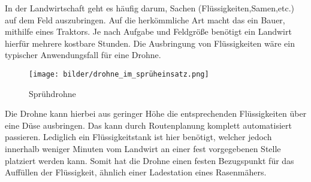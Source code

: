 In der Landwirtschaft geht es häufig darum, Sachen (Flüssigkeiten,Samen,etc.) auf dem Feld auszubringen. Auf die herkömmliche Art macht das ein Bauer, mithilfe eines Traktors. Je nach Aufgabe und Feldgröße benötigt ein Landwirt hierfür mehrere kostbare Stunden. Die Ausbringung von Flüssigkeiten wäre ein typischer Anwendungsfall für eine Drohne.\\

\begin{figure}[ht]
	\centering
	\texttt{[image: bilder/drohne\_im\_sprüheinsatz.png]}
	\caption[Sprühdrohne]{Sprühdrohne}
	\label{fig:sprühdrohne}
\end{figure}

Die Drohne kann hierbei aus geringer Höhe die entsprechenden Flüssigkeiten über eine Düse ausbringen. Das kann durch Routenplanung komplett automatisiert passieren. Lediglich ein Flüssigkeitstank ist hier benötigt, welcher jedoch innerhalb weniger Minuten vom Landwirt an einer fest vorgegebenen Stelle platziert werden kann. Somit hat die Drohne einen festen Bezugspunkt für das Auffüllen der Flüssigkeit, ähnlich einer Ladestation eines Rasenmähers.
